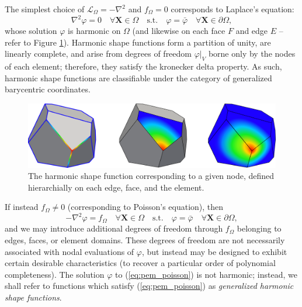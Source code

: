 	The simplest choice of $\mathcal{L}_{\Omega} = -\nabla^2$ and $f_{\Omega} = 0$ corresponds to Laplace's equation:
	\begin{equation}
		\nabla^2 \varphi = 0 \quad \forall \mathbf{X} \in \Omega \quad \text{s.t.} \quad \varphi = \bar{\varphi} \quad \forall \mathbf{X} \in \partial \Omega,
		\label{eq:pem_laplace}
	\end{equation}
	whose solution $\varphi$ is harmonic on $\Omega$ (and likewise on each face $F$ and edge $E$ -- refer to Figure \ref{fig:harmonic_sfs}). Harmonic shape functions form a partition of unity, are linearly complete, and arise from degrees of freedom $\varphi|_V$ borne only by the nodes of each element; therefore, they satisfy the kronecker delta property. As such, harmonic shape functions are classifiable under the category of generalized barycentric coordinates.
	
\begin{figure} [!ht]
	\centering
	\includegraphics[width = 6.0in]{figures/harmonic_sfs.pdf}
	\caption{The harmonic shape function corresponding to a given node, defined hierarchially on each edge, face, and the element.}
	\label{fig:harmonic_sfs}
\end{figure}
	
	If instead $f_{\Omega} \neq 0$ (corresponding to Poisson's equation), then
	\begin{equation}
		-\nabla^2 \varphi = f_{\Omega} \quad \forall \mathbf{X} \in \Omega \quad \text{s.t.} \quad \varphi = \bar{\varphi} \quad \forall \mathbf{X} \in \partial \Omega,
		\label{eq:pem_poisson}
	\end{equation}
	and we may introduce additional degrees of freedom through $f_{\Omega}$ belonging to edges, faces, or element domains. These degrees of freedom are not necessarily associated with nodal evaluations of $\varphi$, but instead may be designed to exhibit certain desirable characteristics (to recover a particular order of polynomial completeness). The solution $\varphi$ to (\ref{eq:pem_poisson}) is not harmonic; instead, we shall refer to functions which satisfy (\ref{eq:pem_poisson}) as \textit{generalized harmonic shape functions}.
	
